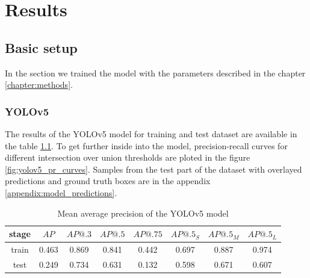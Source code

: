 \chapter{Results}
\label{chapter:results}

\section{Basic setup}
In the section we trained the model with the parameters described in the chapter \ref{chapter:methods}.
\subsection{YOLOv5}
The results of the YOLOv5 model for training and test dataset are available in the table \ref{tab:yolov5_basic}. To get further inside into the model, precision-recall curves for different intersection over union thresholds are ploted in the figure \ref{fig:yolov5_pr_curves}. Samples from the test part of the dataset with overlayed predictions and ground truth boxes are in the appendix \ref{appendix:model_predictions}.
\begin{table}
    \begin{tabular}{c|c|c|c|c|c|c|c}
        stage & $AP$  & $AP@.3$ & $AP@.5$ & $AP@.75$ & $AP@.5_S$ & $AP@.5_M$ & $AP@.5_L$ \\ \hline
        train & 0.463 & 0.869   & 0.841   & 0.442    & 0.697     & 0.887     & 0.974     \\ \hline
        test  & 0.249 & 0.734   & 0.631   & 0.132    & 0.598     & 0.671     & 0.607     \\
    \end{tabular}
    \caption{Mean average precision of the YOLOv5 model}
    \label{tab:yolov5_basic}
\end{table}

